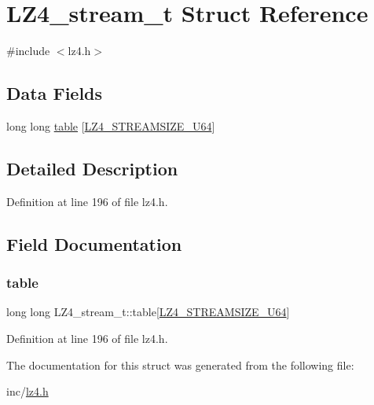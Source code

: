 \hypertarget{structLZ4__stream__t}{}\section{L\+Z4\+\_\+stream\+\_\+t Struct Reference}
\label{structLZ4__stream__t}


{\ttfamily \#include $<$lz4.\+h$>$}

\subsection*{Data Fields}
\begin{DoxyCompactItemize}
\item 
long long \hyperlink{structLZ4__stream__t_ace4521180b0858afb67f9681394b14b4}{table} \mbox{[}\hyperlink{lz4_8h_acddbce79f3e1d413f295e97d986ab3f5}{L\+Z4\+\_\+\+S\+T\+R\+E\+A\+M\+S\+I\+Z\+E\+\_\+\+U64}\mbox{]}
\end{DoxyCompactItemize}


\subsection{Detailed Description}


Definition at line 196 of file lz4.\+h.



\subsection{Field Documentation}
\mbox{\label{structLZ4__stream__t_ace4521180b0858afb67f9681394b14b4}} 
\subsubsection{\texorpdfstring{table}{table}}
{\footnotesize\ttfamily long long L\+Z4\+\_\+stream\+\_\+t\+::table\mbox{[}\hyperlink{lz4_8h_acddbce79f3e1d413f295e97d986ab3f5}{L\+Z4\+\_\+\+S\+T\+R\+E\+A\+M\+S\+I\+Z\+E\+\_\+\+U64}\mbox{]}}



Definition at line 196 of file lz4.\+h.



The documentation for this struct was generated from the following file\+:\begin{DoxyCompactItemize}
\item 
inc/\hyperlink{lz4_8h}{lz4.\+h}\end{DoxyCompactItemize}
